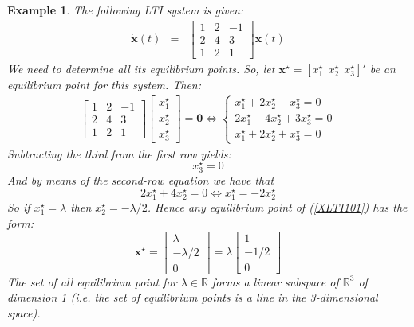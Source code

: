\documentclass[a4paper,10pt,oneside]{book}
\newtheorem{example}{Example}
\begin{document}
\begin{example}
 The following LTI system is given:
\begin{eqnarray}
 \dot{\mathbf{x}}(t)&=&\left[ {\begin{array}{ccc}
 1 & 2 & -1 \\
 2 & 4 & 3  \\
 1 & 2 & 1
 \end{array} } \right]
\mathbf{x}(t)\label{XLTI101}
\end{eqnarray}
We need to determine all its equilibrium points. So, let $\mathbf{x}^\star=[x_1^\star \ \  x_2^\star \ \  x_3^\star]'$ be an equilibrium point for this system. Then:
\begin{eqnarray}
 \left[ {\begin{array}{ccc}
 1 & 2 & -1 \\
 2 & 4 & 3  \\
 1 & 2 & 1
 \end{array} } \right]\left[ {\begin{array}{c}
 x_1^\star \\
 x_2^\star  \\
 x_3^\star
 \end{array} } \right]=\mathbf{0}\Leftrightarrow
\left\{ {\begin{array}{c}
 x_1^\star+2x_2^\star-x_3^\star=0 \\
 2x_1^\star+4x_2^\star+3x_3^\star=0 \\
 x_1^\star+2x_2^\star+x_3^\star=0 
 \end{array} } \right.
\end{eqnarray}
Subtracting the third from the first row yields:
\begin{equation}
x_3^\star=0 
\end{equation}
And by means of the second-row equation we have that
\begin{equation}
 2x_1^\star+4x_2^\star=0\Leftrightarrow x_1^\star=-2x_2^\star
\end{equation}
So if $x_1^\star=\lambda$ then $x_2^\star=-\lambda/2$.
Hence any equilibrium point of (\ref{XLTI101}) has the form:
\begin{equation}
 \mathbf{x}^\star=\left[ {\begin{array}{c}
 \lambda \\
 -\lambda/2  \\
 0
 \end{array} } \right]=\lambda\left[ {\begin{array}{c}
 1 \\
 -1/2  \\
 0
 \end{array} } \right]
\end{equation}
The set of all equilibrium point for $\lambda\in\mathbb{R}$ forms a linear subspace of $\mathbb{R}^3$ of dimension 1 (i.e. the set of equilibrium points is a line in the 3-dimensional space).
\end{example}
\end{document}
